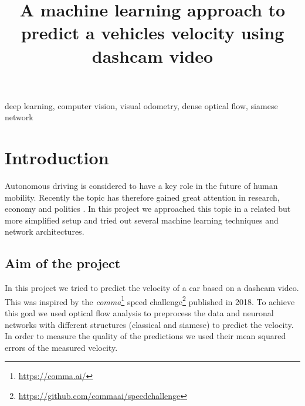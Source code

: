 \documentclass[conference]{IEEEtran}
\begin{document}
\title{A machine learning approach to predict a vehicles velocity using dashcam video}

\author{
\and
{}
}

\maketitle

\begin{abstract}
\blindtext[2]
\end{abstract}

\begin{IEEEkeywords}
deep learning, computer vision, visual odometry, dense optical flow, siamese network
\end{IEEEkeywords}

\section{Introduction}

Autonomous driving is considered to have a key role in the future of human mobility. Recently the topic has therefore gained great attention in research, economy and politics \cite{Maurer2016}. In this project we approached this topic in a related but more simplified setup and tried out several machine learning techniques and network architectures.

\subsection{Aim of the project}
\label{subsec:AimAndMeasure}

In this project we tried to predict the velocity of a car based on a dashcam video. This was inspired by  the \emph{comma}\footnote{\url{https://comma.ai/}} speed challenge\footnote{\url{https://github.com/commaai/speedchallenge}} published in 2018. To achieve this goal we used optical flow analysis to preprocess the data and neuronal networks with different structures (classical and siamese) to predict the velocity. In order to measure the quality of the predictions we used their mean squared errors of the measured velocity.
\end{document}
